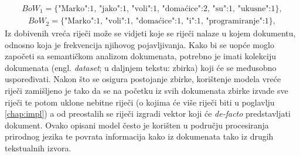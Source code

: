 \documentclass[times, utf8, zavrsni]{fer}
\begin{document}
\begin{align*}
{{BoW_{1}}=\{\text{{"Marko":1, "jako":1, "voli":1, "domaćice":2, "su":1, "ukusne":1}}}\},
\end{align*}
\begin{align*}
{{BoW_{2}}=\{\text{{"Marko":1, "voli":1, "domaćice":1, "i":1, "programiranje":1}}}\},
\end{align*}
Iz dobivenih vreća riječi može se vidjeti koje se riječi nalaze u kojem dokumentu, odnosno koja je frekvencija njihovog pojavljivanja. \newline
Kako bi se uopće moglo započeti sa semantičkom analizom dokumenata, potrebno je imati kolekciju dokumenata (engl. \textit{dataset}; u daljnjem tekstu: zbirka) koji će se međusobno uspoređivati. Nakon što se osigura postojanje zbirke, korištenje modela vreće riječi zamišljeno je tako da se na početku iz svih dokumenata zbirke izvade sve riječi te potom uklone nebitne riječi (o kojima će više riječi biti u poglavlju \ref{chap:impl}) a od preostalih se riječi izgradi vektor koji će \textit{de-facto} predstavljati dokument. Ovako opisani model često je korišten u području procesiranja prirodnog jezika te povrata informacija kako iz dokumenata tako iz drugih tekstualnih izvora.
\end{document}
